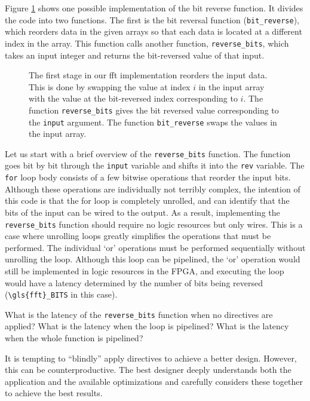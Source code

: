 Figure \ref{fig:fft_bit_reverse} shows one possible implementation of the bit reverse function. It divides the code into two functions. The first is the bit reversal function (\lstinline|bit_reverse|), which reorders data in the given arrays so that each data is located at a different index in the array. This function calls another function, \lstinline|reverse_bits|, which takes an input integer and returns the bit-reversed value of that input.

\begin{figure}

\caption{ The first stage in our \gls{fft} implementation reorders the input data. This is done by swapping the value at index $i$ in the input array with the value at the bit-reversed index corresponding to $i$. The function \lstinline|reverse_bits| gives the bit reversed value corresponding to the \lstinline|input| argument. The function \lstinline|bit_reverse| swaps the values in the input array. }
\label{fig:fft_bit_reverse}
\end{figure}

Let us start with a brief overview of the \lstinline|reverse_bits| function. The function goes bit by bit through the \lstinline|input| variable and shifts it into the \lstinline|rev| variable. The \lstinline|for| loop body consists of a few bitwise operations that reorder the input bits. Although these operations are individually not terribly complex, the intention of this code is that the for loop is completely unrolled, and \VHLS can identify that the bits of the input can be wired to the output.  As a result, implementing the \lstinline|reverse_bits| function should require no logic resources but only wires.  This is a case where unrolling loops greatly simplifies the operations that must be performed.  The individual `or' operations must be performed sequentially without unrolling the loop.  Although this loop can be pipelined, the `or' operation would still be implemented in logic resources in the FPGA, and executing the loop would have a latency determined by the number of bits being reversed (\lstinline|\gls{fft}_BITS| in this case).

\begin{exercise}
What is the latency of the \lstinline|reverse_bits| function when no directives are applied? What is the latency when the loop is pipelined?  What is the latency when the whole function is pipelined?
\end{exercise}

\begin{aside}
It is tempting to ``blindly'' apply directives to achieve a better design. However, this can be counterproductive. The best designer deeply understands both the application and the available optimizations and carefully considers these together to achieve the best results. 
\end{aside}

